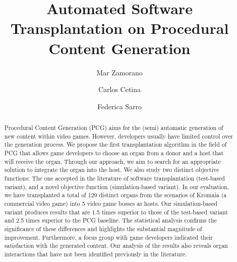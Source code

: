 \documentclass[sigconf,screen,review,anonymous]{acmart}
\newcommand{\CaseStudy}{Kromaia}
\begin{document}
\title{Automated Software Transplantation on Procedural Content Generation}

\author{Mar Zamorano}

\author{Carlos Cetina}

\author{Federica Sarro}

\renewcommand{\shortauthors}{Zamorano et al.}

\begin{abstract}
Procedural Content Generation (PCG) aims for the (semi) automatic generation of new content within video games. However, developers usually have limited control over the generation process.
We propose the first transplantation algorithm in the field of PCG that allows game developers to choose an organ from a donor and a host that will receive the organ. Through our approach, we aim to search for an appropriate solution to integrate the organ into the host. We also study two distinct objective functions: The one accepted in the literature of  software transplantation (test-based variant), and a novel objective function (simulation-based variant).
In our evaluation, we have transplanted a total of 129 distinct organs from the scenarios of \CaseStudy{} (a commercial video game) into 5 video game bosses as hosts.
Our simulation-based variant produces results that are 1.5 times superior to those of the test-based variant and 2.5 times superior to the PCG baseline. The statistical analysis confirms the significance of these differences and highlights the substantial magnitude of improvement.
Furthermore, a focus group with game developers indicated their satisfaction with the generated content.
Our analysis of the results also reveals organ interactions that have not been  identified previously in the literature.
\end{abstract}

\end{document}
